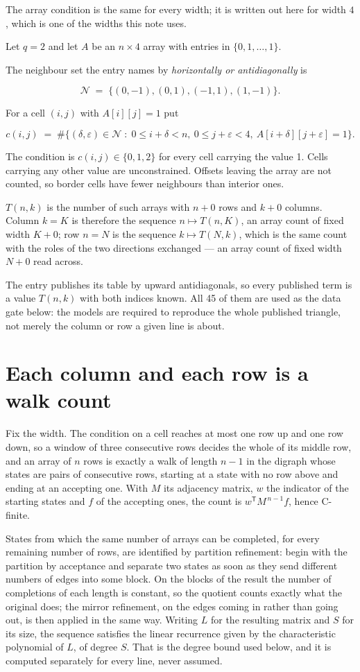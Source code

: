 \documentclass[11pt]{article}
\theoremstyle{definition}
\begin{document}
The array condition is the same for every width; it is written out here for width $4$, which is one of the widths this note uses.

Let $q = 2$ and let $A$ be an $n \times 4$ array with entries in $\{0,1,\dots,1\}$.

The neighbour set the entry names by {\itshape horizontally or antidiagonally} is

\[\mathcal{N} \;=\; \{(0,-1), (0,1), (-1,1), (1,-1)\}.\]

For a cell $(i,j)$ with $A[i][j] = 1$ put

\[c(i,j) \;=\; \#\bigl\{(\delta,\varepsilon)\in\mathcal{N} \;:\; 0\le i+\delta<n,\ 0\le j+\varepsilon<4,\ A[i+\delta][j+\varepsilon] = 1\bigr\}.\]

The condition is $c(i,j) \in \{0, 1, 2\}$ for every cell carrying the value 1. Cells carrying any other value are unconstrained. Offsets leaving the array are not counted, so border cells have fewer neighbours than interior ones.

$T(n,k)$ is the number of such arrays with $n + 0$ rows and $k + 0$ columns. Column $k = K$ is therefore the sequence $n \mapsto T(n,K)$, an array count of fixed width $K + 0$; row $n = N$ is the sequence $k \mapsto T(N,k)$, which is the same count with the roles of the two directions exchanged --- an array count of fixed width $N + 0$ read across.

The entry publishes its table by upward antidiagonals, so every published term is a value $T(n,k)$ with both indices known. All 45 of them are used as the data gate below: the models are required to reproduce the whole published triangle, not merely the column or row a given line is about.

\section{Each column and each row is a walk count}

Fix the width. The condition on a cell reaches at most one row up and one row down, so a window of three consecutive rows decides the whole of its middle row, and an array of $n$ rows is exactly a walk of length $n-1$ in the digraph whose states are pairs of consecutive rows, starting at a state with no row above and ending at an accepting one. With $M$ its adjacency matrix, $w$ the indicator of the starting states and $f$ of the accepting ones, the count is $w^{\mathsf T}M^{\,n-1}f$, hence C-finite.

States from which the same number of arrays can be completed, for every remaining number of rows, are identified by partition refinement: begin with the partition by acceptance and separate two states as soon as they send different numbers of edges into some block. On the blocks of the result the number of completions of each length is constant, so the quotient counts exactly what the original does; the mirror refinement, on the edges coming in rather than going out, is then applied in the same way. Writing $L$ for the resulting matrix and $S$ for its size, the sequence satisfies the linear recurrence given by the characteristic polynomial of $L$, of degree $S$. That is the degree bound used below, and it is computed separately for every line, never assumed.
\end{document}
